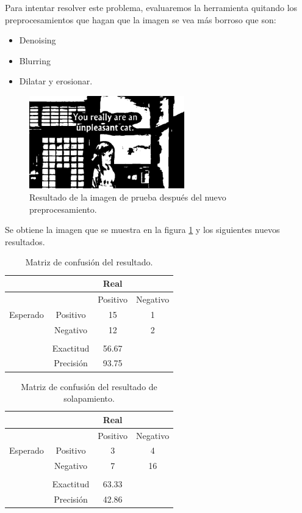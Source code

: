 Para intentar resolver este problema, evaluaremos la herramienta quitando los preprocesamientos que hagan que la imagen se vea más borroso que son:
\begin{itemize}
	\item Denoising
	\item Blurring
	\item Dilatar y erosionar.
\end{itemize}
\begin{figure}[H]
	\centering
	\includegraphics[width = 0.6\textwidth]{Imagenes/Evaluacion_OCR/2_p.png}
	\caption{Resultado de la imagen de prueba después del nuevo preprocesamiento.}
	\label{fig:Eva_2PP}
\end{figure}
Se obtiene la imagen que se muestra en la figura \ref{fig:Eva_2PP} y los siguientes nuevos resultados.
\begin{table}[H]
	\centering
	\begin{tabular}{|c|c|c|c|}
		\hline
		& & Real &   \\
		\hline
		&          & Positivo & Negativo                   \\
		\hline
		Esperado & Positivo & 15& 1 \\
		\hline
		& Negativo & 		  12& 2                \\
		\hline
		 						&&&\\
		\hline
		&Exactitud& 56.67 & \\
		\hline
		&Precisión& 93.75 &\\
		\hline
	\end{tabular}
	\caption{Matriz de confusión del resultado.}
\label{table:mt_pos}
\end{table}
\begin{table}[H]
	\centering
	\begin{tabular}{|c|c|c|c|}
		\hline
		& & Real &   \\
		\hline
		&          & Positivo & Negativo                   \\
		\hline
		Esperado & Positivo & 3& 4 \\
		\hline
		& Negativo & 		  7& 16                \\
		\hline
		 						&&&\\
		\hline
		&Exactitud& 63.33 & \\
		\hline
		&Precisión& 42.86 &\\
		\hline
	\end{tabular}
	\caption{Matriz de confusión del resultado de solapamiento.}
\label{table:mt_pos_sol}
\end{table}

